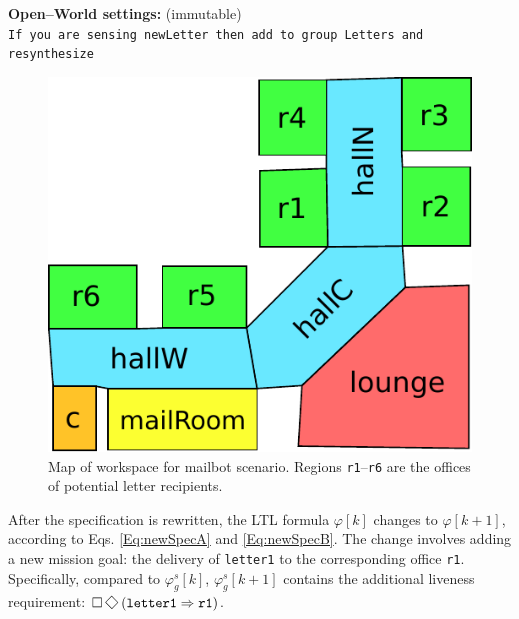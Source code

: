 \begin{algorithm}
{%
	
	
	\textbf{Open--World settings:} (immutable)\\
	\texttt{If you are sensing newLetter then add to group Letters and resynthesize}\\
		
	}
	\vspace{-8 pt}
\end{algorithm}

\begin{figure}[h]
	\centering
	\includegraphics[width=0.70\columnwidth, clip]{./img/mailbot_map.pdf}
	\caption{Map of workspace for mailbot scenario.  Regions \texttt{r1}--\texttt{r6} are the offices of potential letter recipients.} 
	\label{Fig:map}
\end{figure}

After the specification is rewritten, the LTL formula $\varphi [k]$ changes to $\varphi [k+1]$, according to Eqs. \eqref{Eq:newSpecA} and \eqref{Eq:newSpecB}. The change involves adding a new mission goal: the delivery of \texttt{letter1} to the corresponding office \texttt{r1}. Specifically, compared to $\varphi_g^s [k]$, $\varphi_g^s [k+1]$ contains the additional liveness requirement:
$\G\F\left( \texttt{letter1} \Rightarrow \texttt{r1} \right)$.

